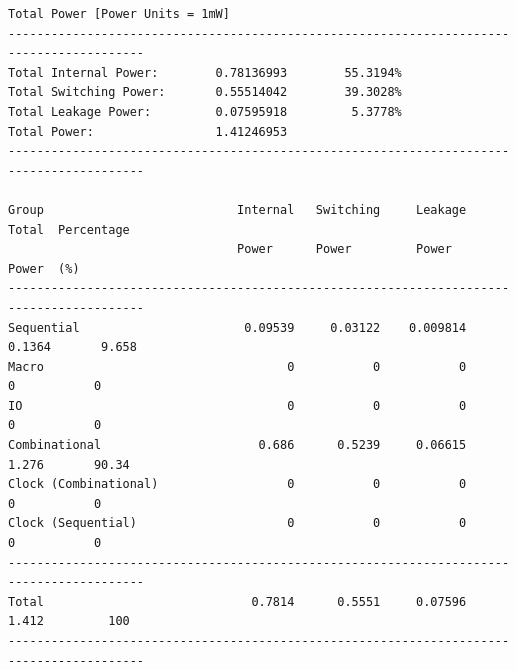 \begin{Verbatim}[fontsize=\footnotesize]
Total Power [Power Units = 1mW]
-----------------------------------------------------------------------------------------
Total Internal Power:        0.78136993 	   55.3194%
Total Switching Power:       0.55514042 	   39.3028%
Total Leakage Power:         0.07595918 	    5.3778%
Total Power:                 1.41246953 
-----------------------------------------------------------------------------------------

Group                           Internal   Switching     Leakage       Total  Percentage 
                                Power      Power         Power         Power  (%)        
-----------------------------------------------------------------------------------------
Sequential                       0.09539     0.03122    0.009814      0.1364       9.658 
Macro                                  0           0           0           0           0 
IO                                     0           0           0           0           0 
Combinational                      0.686      0.5239     0.06615       1.276       90.34 
Clock (Combinational)                  0           0           0           0           0 
Clock (Sequential)                     0           0           0           0           0 
-----------------------------------------------------------------------------------------
Total                             0.7814      0.5551     0.07596       1.412         100 
-----------------------------------------------------------------------------------------
\end{Verbatim}